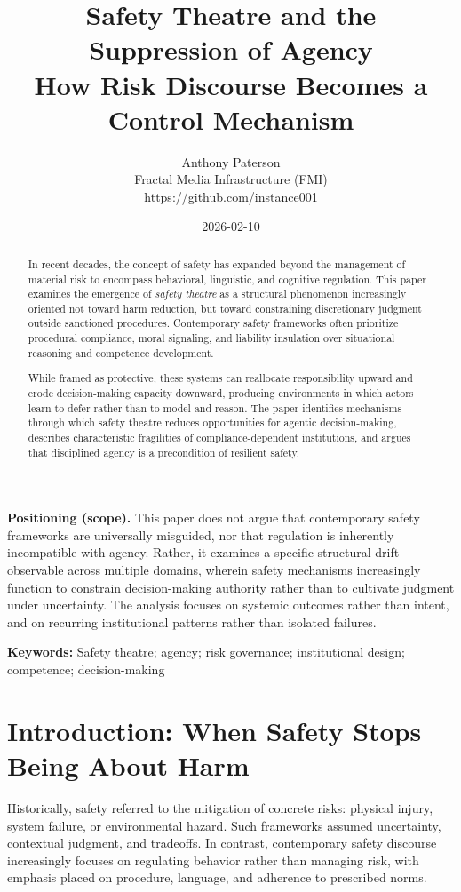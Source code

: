 \documentclass[11pt]{article}
\title{Safety Theatre and the Suppression of Agency\\\large How Risk Discourse Becomes a Control Mechanism}
\author{Anthony Paterson\\Fractal Media Infrastructure (FMI)\\\url{https://github.com/instance001}}
\date{2026-02-10}
\begin{document}
\maketitle

\begin{abstract}
In recent decades, the concept of safety has expanded beyond the management of material
risk to encompass behavioral, linguistic, and cognitive regulation. This paper examines
the emergence of \emph{safety theatre} as a structural phenomenon increasingly oriented
not toward harm reduction, but toward constraining discretionary judgment outside
sanctioned procedures. Contemporary safety frameworks often prioritize procedural
compliance, moral signaling, and liability insulation over situational reasoning and
competence development.

While framed as protective, these systems can reallocate responsibility upward and
erode decision-making capacity downward, producing environments in which actors learn
to defer rather than to model and reason. The paper identifies mechanisms through
which safety theatre reduces opportunities for agentic decision-making, describes
characteristic fragilities of compliance-dependent institutions, and argues that
disciplined agency is a precondition of resilient safety.
\end{abstract}

\noindent\textbf{Positioning (scope).} This paper does not argue that contemporary
safety frameworks are universally misguided, nor that regulation is inherently
incompatible with agency. Rather, it examines a specific structural drift observable
across multiple domains, wherein safety mechanisms increasingly function to constrain
decision-making authority rather than to cultivate judgment under uncertainty. The
analysis focuses on systemic outcomes rather than intent, and on recurring
institutional patterns rather than isolated failures.

\medskip
\noindent\textbf{Keywords:} Safety theatre; agency; risk governance; institutional
design; competence; decision-making

\section{Introduction: When Safety Stops Being About Harm}

Historically, safety referred to the mitigation of concrete risks: physical injury,
system failure, or environmental hazard. Such frameworks assumed uncertainty,
contextual judgment, and tradeoffs. In contrast, contemporary safety discourse
increasingly focuses on regulating behavior rather than managing risk, with emphasis
placed on procedure, language, and adherence to prescribed norms.
\end{document}
